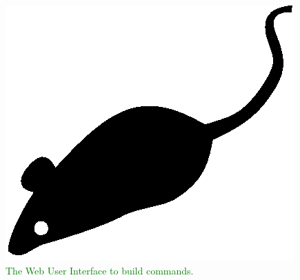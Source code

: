 \begin{figure}[tp]
  \centering
  \includegraphics{./fig/acmlarge-mouse}
  \caption{\textcolor{green}{The Web User Interface to build commands.}}
    \label{fig:commands-wui}
\end{figure}

\textcolor{green}{\lipsum[1]}
